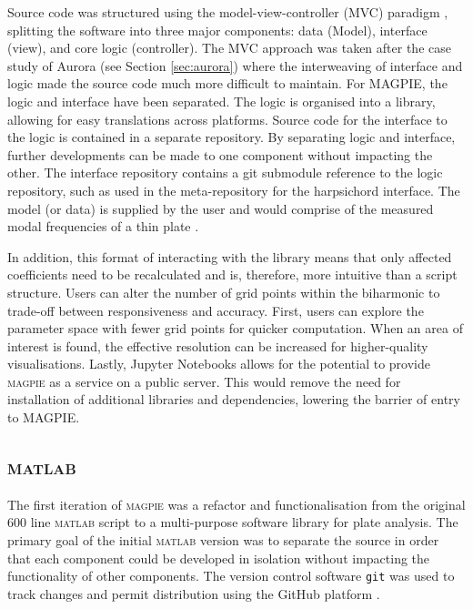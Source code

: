Source code was structured using the model-view-controller (MVC) paradigm \cite{krasner_description_1988}, splitting the software into three major components: data (Model), interface (view), and core logic (controller). The MVC approach was taken after the case study of Aurora (see Section \ref{sec:aurora}) where the interweaving of interface and logic made the source code much more difficult to maintain. For MAGPIE, the logic and interface have been separated. The logic is organised into a library, allowing for easy translations across platforms. Source code for the interface to the logic is contained in a separate repository. By separating logic and interface, further developments can be made to one component without impacting the other. 
The interface repository contains a git submodule reference to the logic repository, such as used in the meta-repository for the harpsichord interface.
The model (or data) is supplied by the user and would comprise of the measured modal frequencies of a thin plate \cite{duran_use_2025}.

In addition, this format of interacting with the library means that only affected coefficients need to be recalculated and is, therefore, more intuitive than a script structure. Users can alter the number of grid points within the biharmonic to trade-off between responsiveness and accuracy. First, users can explore the parameter space with fewer grid points for quicker computation. When an area of interest is found, the effective resolution can be increased for higher-quality visualisations. Lastly, Jupyter Notebooks allows for the potential to provide \textsc{magpie} as a service on a public server. This would remove the need for installation of additional libraries and dependencies, lowering the barrier of entry to MAGPIE. 


\subsection{\textsc{matlab}}

The first iteration of \textsc{magpie} was a refactor and functionalisation from the original 600 line \textsc{matlab} script to a multi-purpose software library for plate analysis. The primary goal of the initial \textsc{matlab} version was to separate the source in order that each component could be developed in isolation without impacting the functionality of other components. The version control software \texttt{git} was used to track changes and permit distribution using the GitHub platform \cite{magpie_matlab_2025}.


